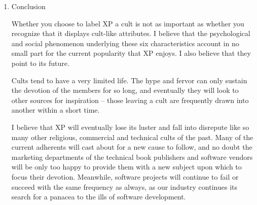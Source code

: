 \documentclass{article}
\begin{document}
\begin{enumerate}
In the case of XP, the organizational circumstances required to perform
all the core practices are so particular that it is doubtful if more
than a handful of companies could ever host an authentic XP project.
Therefore practitioners are forced to perform partial implementations of
XP. If they are unsuccessful, then failure is attributed to the impurity
of their implementation rather than any failing or infeasibility of XP
itself. The quest for individual purity is a feature common to many
cults, as is the contrivance of circumstances that render it ultimately
unachievable.

Much is made of the "humanity" of the methodology, the transition from
"journeyman" to "master", and the focus upon individual qualities and
contributions. Consideration of these softer, cultural aspects of XP has
devolved into the sort of pseudoscience we often find in new age cults
centered on the notion of "personal power" and "personal growth". To
quote one zealot "XP is a culture, not a method." \footnote{\emph{Enculturating Extreme Programmers}, David M. West} The elevation of
a new and unproven methodology to the philosophical status of a Zen-like
belief system demonstrates the skewed perspective that typifies cult
mentality.

\item Conclusion
\label{sec:orgheadline196}

Whether you choose to label XP a cult is not as important as whether you
recognize that it displays cult-like attributes. I believe that the
psychological and social phenomenon underlying these six characteristics
account in no small part for the current popularity that XP enjoys. I
also believe that they point to its future.

Cults tend to have a very limited life. The hype and fervor can only
sustain the devotion of the members for so long, and eventually they
will look to other sources for inspiration -- those leaving a cult are
frequently drawn into another within a short time.

I believe that XP will eventually lose its luster and fall into
disrepute like so many other religious, commercial and technical cults
of the past. Many of the current adherents will cast about for a new
cause to follow, and no doubt the marketing departments of the technical
book publishers and software vendors will be only too happy to provide
them with a new subject upon which to focus their devotion. Meanwhile,
software projects will continue to fail or succeed with the same
frequency as always, as our industry continues its search for a panacea
to the ills of software development.
\end{enumerate}
\end{document}
